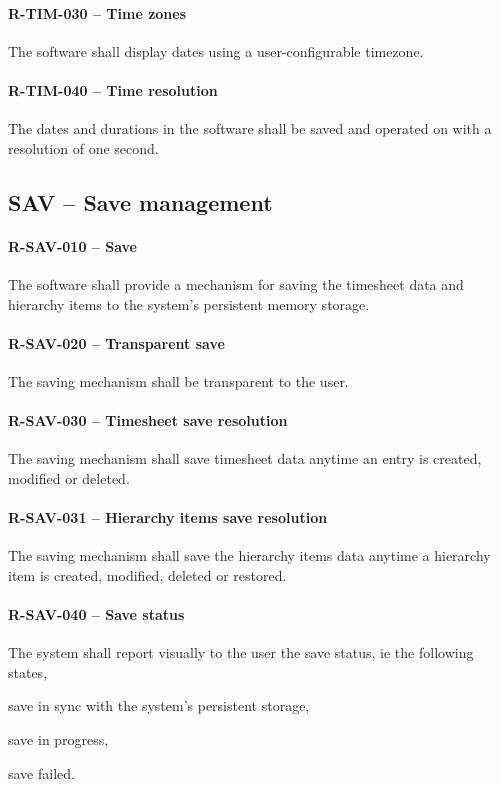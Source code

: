 \paragraph{R-TIM-030 -- Time zones}
The software shall display dates using a user-configurable timezone.

\paragraph{R-TIM-040 -- Time resolution}
The dates and durations in the software shall be saved and operated
on with a resolution of one second.

\subsection{SAV -- Save management}
\paragraph{R-SAV-010 -- Save}
The software shall provide a mechanism for saving the timesheet data
and hierarchy items to the system's persistent memory storage.

\paragraph{R-SAV-020 -- Transparent save}
The saving mechanism shall be transparent to the user.

\paragraph{R-SAV-030 -- Timesheet save resolution}
The saving mechanism shall save timesheet data anytime an entry is
created, modified or deleted.

\paragraph{R-SAV-031 -- Hierarchy items save resolution}
The saving mechanism shall save the hierarchy items data anytime
a hierarchy item is created, modified, deleted or restored.

\paragraph{R-SAV-040 -- Save status}
The system shall report visually to the user the save status, ie
the following states,
\begin{compactitem}
  \item save in sync with the system's persistent storage,
  \item save in progress,
  \item save failed.
\end{compactitem}

